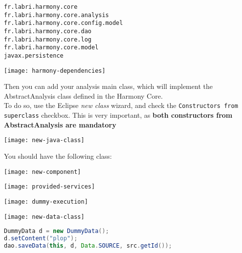 \begin{lstlisting}
fr.labri.harmony.core
fr.labri.harmony.core.analysis
fr.labri.harmony.core.config.model
fr.labri.harmony.core.dao
fr.labri.harmony.core.log
fr.labri.harmony.core.model
javax.persistence
\end{lstlisting}

\noindent
\texttt{[image: harmony-dependencies]}

Then you can add your analysis main class, which will implement the AbstractAnalysis class defined in the Harmony Core.\\
To do so, use the Eclipse \emph{new class} wizard, and check the \texttt{Constructors from superclass} checkbox. 
This is very important, as \textbf{both constructors from AbstractAnalysis are mandatory}

\texttt{[image: new-java-class]}

You should have the following class:



\texttt{[image: new-component]}

\texttt{[image: provided-services]}

\texttt{[image: dummy-execution]}

\texttt{[image: new-data-class]}


\begin{lstlisting}[language=Java]
DummyData d = new DummyData();
d.setContent("plop");
dao.saveData(this, d, Data.SOURCE, src.getId());
\end{lstlisting}




